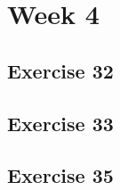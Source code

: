 \documentclass[a4paper]{article}
\let\stdsection\section
\renewcommand\section{\newpage\stdsection}
\begin{document}
\section*{Week 4}


\subsection*{Exercise 32}


\newpage
\subsection*{Exercise 33}






%
%
%
%

\newpage
\subsection*{Exercise 35}
\end{document}
